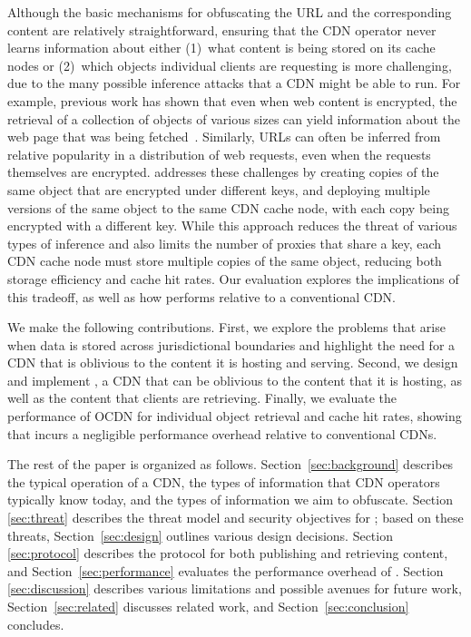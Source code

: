 Although the basic mechanisms for obfuscating the URL and the corresponding
content are relatively straightforward, ensuring that the CDN operator never
learns information about either (1)~what content is being stored on its cache
nodes or (2)~which objects individual clients are requesting is more
challenging, due to the many possible inference attacks that a CDN might be
able to run. For example, previous work has shown that even when web content
is encrypted, the retrieval of a collection of objects of various sizes can
yield information about the web page that was being fetched~\cite{panchenko2016website,
cai2012touching}. Similarly, URLs
can often be inferred from relative popularity in a distribution of web
requests, even when the requests themselves are encrypted. \system{} addresses
these challenges by creating copies of the same object that are encrypted
under different keys, and deploying multiple versions of the same object to
the same CDN cache node, with each copy being encrypted with a different key.
While this approach reduces the threat of various types of inference and also
limits the number of \system{} proxies that share a key, each CDN cache node must
store multiple copies of the same object, reducing both storage efficiency and
cache hit rates. Our evaluation explores the implications of this tradeoff, as
well as how \system{} performs relative to a conventional CDN.

We make the following contributions. First, we explore the problems that
arise when data is stored across jurisdictional boundaries and highlight the
need for a CDN that is oblivious to the content it is hosting and serving.
Second, we design and implement \system{}, a CDN that can be oblivious to the
content that it is hosting, as well as the content that clients are
retrieving. Finally, we evaluate the performance of OCDN for individual
object retrieval and cache hit rates, showing that \system{} incurs a negligible performance
overhead relative to conventional CDNs.

The rest of the paper is organized as follows. Section~\ref{sec:background} describes
the typical operation of a CDN, the types of information that CDN operators
typically know today, and the types of information we aim to obfuscate.  Section~
\ref{sec:threat} describes the threat model and security objectives for \system{}; based
on these threats, Section~\ref{sec:design} outlines various design decisions. Section~
\ref{sec:protocol} describes the protocol for both publishing and retrieving content,
and Section~\ref{sec:performance} evaluates the performance overhead of \system{}. Section~
\ref{sec:discussion} describes various limitations and possible avenues for future
work, Section~\ref{sec:related} discusses related work, and Section~\ref{sec:conclusion}
concludes.


